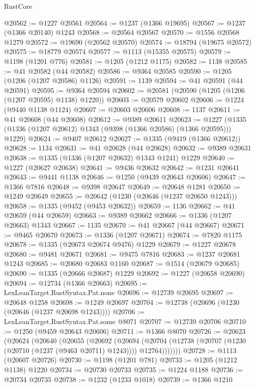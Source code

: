 \begin{lexlean}{RustCore}
\begin{coremodule}
@20562 := @1227 @20561
@20564 := @1237 (@1366 @19695)
@20567 := @1237 (@1366 @20140) @1243
@20568 := @20564 @20567
@20570 := @1556 @20568 @1279
@20572 := @19690 (@20562 @20570)
@20574 := @18794 (@19675 @20572)
@20575 := @18779 @20574
@20577 := @1113 (@15355 @20575)
@20579 := @1198 (@1201 @776)
@20581 := @1205 (@1212 @1175)
@20582 := 1138
@20585 := @41 @20582 (@44 @20582)
@20586 := @9364 @20585
@20590 := @1205 (@1206 (@1207 @20586) @1126)
@20591 := 1139
@20594 := @41 @20591 (@44 @20591)
@20595 := @9364 @20594
@20602 := @20581 (@20590 (@1205 (@1206 (@1207 @20595) @1138) @1220))
@20603 := @20579 @20602
@20606 := @1224 (@9440 @1138 @1124)
@20607 := @20603 @20606
@20608 := 1137
@20611 := @41 @20608 (@44 @20608)
@20612 := @9389 @20611
@20623 := @1227 (@1335 (@1336 (@1207 @20612) @1343 (@9398 (@1366 @20586) (@1366 @20595))) @1229)
@20624 := @9407 @20612
@20627 := @1335 (@9419 (@1366 @20612))
@20628 := 1134
@20631 := @41 @20628 (@44 @20628)
@20632 := @9389 @20631
@20638 := @1335 (@1336 (@1207 @20632) @1343 @1241) @1229
@20640 := @1227 (@20627 @20638)
@20641 := @9436 @20632
@20642 := @1231 @20641
@20643 := @9441 @1138
@20646 := @1250 (@9439 @20643 @20606)
@20647 := @1366 @7816
@20648 := @9398 @20647
@20649 := @20648 @1281
@20650 := @1249 @20649
@20655 := @20642 (@1230 (@20646 (@1237 @20650 @1243)))
@20658 := @1335 (@9452 (@9453 @20632))
@20659 := 1136
@20662 := @41 @20659 (@44 @20659)
@20663 := @9389 @20662
@20666 := @1336 (@1207 @20663) @1343
@20667 := 1135
@20670 := @41 @20667 (@44 @20667)
@20671 := @9465 @20670
@20673 := @1336 (@1207 @20671)
@20674 := @7820 @1175
@20678 := @1335 (@20673 @20674 @9476) @1229
@20679 := @1227 @20678
@20680 := @9481 @20671
@20681 := @9475 @7816
@20683 := @1237 @20681 @1243
@20685 := @20680 @20683 @1160
@20687 := @1514 (@20679 @20685)
@20690 := @1335 (@20666 @20687) @1229
@20692 := @1227 (@20658 @20690)
@20694 := @12734 (@1366 @20663)
@20695 := LexLeanTarget.RustSyntax.Pat.none
@20696 := @12739 @20695
@20697 := @20648 @1258
@20698 := @1249 @20697
@20704 := @12738 (@20696 (@1230 (@20646 (@1237 @20698 @1243))))
@20706 := LexLeanTarget.RustSyntax.Pat.some @8071
@20707 := @12739 @20706
@20710 := @1250 (@9459 @20643 @20606)
@20711 := @1366 @8070
@20726 := @20623
    (@20624
      (@20640
        (@20655
          (@20692
            (@20694
              (@20704 (@12738 (@20707 (@1230 (@20710 (@1237 (@9463 @20711) @1243)))) @12764)))))))
@20728 := @1113 (@20607 @20726)
@20730 := @1198 (@1201 @781)
@20733 := @1205 (@1212 @1138) @1220
@20734 := @20730 @20733
@20735 := @1224 @1188
@20736 := @20734 @20735
@20738 := @1232 (@1233 @1018)
@20739 := @1366 @1210

\end{coremodule}
\end{lexlean}
